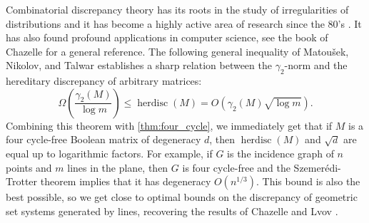 \documentclass[11pt]{amsart}
\theoremstyle{plain}
\theoremstyle{definition}
\DeclareMathOperator{\herdisc}{herdisc}
\begin{document}
Combinatorial discrepancy theory has its roots in the study of irregularities of distributions and it has become a highly active area of research since the 80's \cite{BC}. It has also found profound applications in computer science, see the book of Chazelle \cite{Ch} for a general reference. The following general inequality of Matou\v{s}ek, Nikolov, and Talwar \cite{MNT} establishes a sharp relation between the $\gamma_2$-norm and the hereditary discrepancy of arbitrary matrices:
    $$\Omega\left(\frac{\gamma_2(M)}{\log m}\right)\leq \herdisc(M)=O(\gamma_2(M)\sqrt{\log m}).$$
Combining this theorem with \cref{thm:four_cycle}, we immediately get that if $M$ is a four cycle-free Boolean matrix of degeneracy $d$, then $\herdisc(M)$ and $\sqrt{d}$ are equal up to logarithmic factors. For example, if $G$ is the incidence graph of $n$ points and $m$ lines in the plane, then $G$ is four cycle-free and the Szemer\'edi-Trotter theorem implies that it has degeneracy $O(n^{1/3})$. This bound is also the best possible, so we get close to optimal bounds on the discrepancy of geometric set systems generated by lines, recovering the results of Chazelle and Lvov \cite{ChL}.
\end{document}
